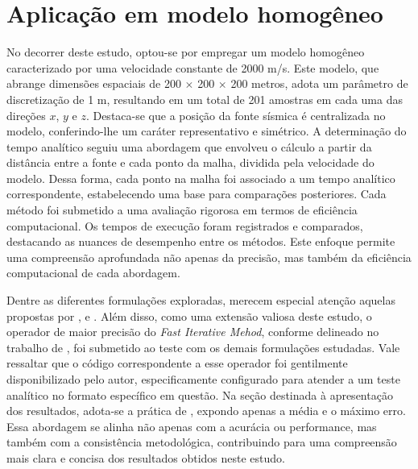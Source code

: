 \section{Aplicação em modelo homogêneo}

No decorrer deste estudo, optou-se por empregar um modelo homogêneo caracterizado por uma velocidade constante de 2000 m/s. Este modelo, que abrange dimensões espaciais de 200 $\times$ 200 $\times$ 200 metros, adota um parâmetro de discretização de 1 m, resultando em um total de 201 amostras em cada uma das direções $x$, $y$ e $z$. Destaca-se que a posição da fonte sísmica é centralizada no modelo, conferindo-lhe um caráter representativo e simétrico. A determinação do tempo analítico seguiu uma abordagem que envolveu o cálculo a partir da distância entre a fonte e cada ponto da malha, dividida pela velocidade do modelo. Dessa forma, cada ponto na malha foi associado a um tempo analítico correspondente, estabelecendo uma base para comparações posteriores. Cada método foi submetido a uma avaliação rigorosa em termos de eficiência computacional. Os tempos de execução foram registrados e comparados, destacando as nuances de desempenho entre os métodos. Este enfoque permite uma compreensão aprofundada não apenas da precisão, mas também da eficiência computacional de cada abordagem.

Dentre as diferentes formulações exploradas, merecem especial atenção aquelas propostas por ,  e . Além disso, como uma extensão valiosa deste estudo, o operador de maior precisão do \textit{Fast Iterative Mehod}, conforme delineado no trabalho de , foi submetido ao teste com os demais formulações estudadas. Vale ressaltar que o código correspondente a esse operador foi gentilmente disponibilizado pelo autor, especificamente configurado para atender a um teste analítico no formato específico em questão. Na seção destinada à apresentação dos resultados, adota-se a prática de , expondo apenas a média e o máximo erro. Essa abordagem se alinha não apenas com a acurácia ou performance, mas também com a consistência metodológica, contribuindo para uma compreensão mais clara e concisa dos resultados obtidos neste estudo. 


